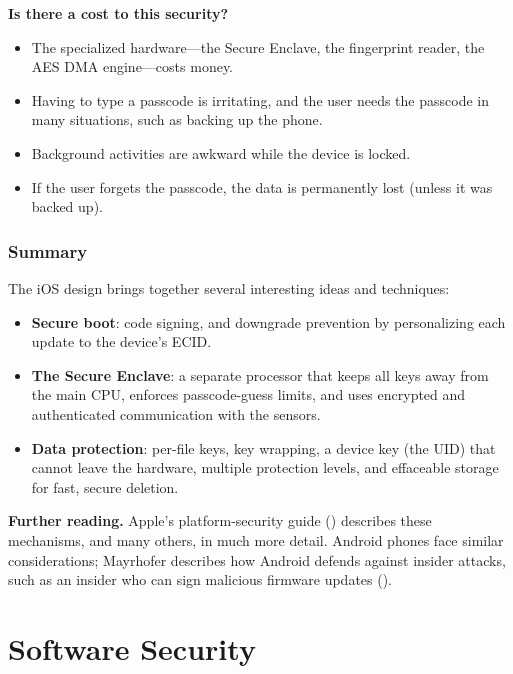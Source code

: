 \documentclass[
  letterpaper,
]{scrbook}
\providecommand{\tightlist}{%
  \setlength{\itemsep}{0pt}\setlength{\parskip}{0pt}}
\theoremstyle{definition}
\theoremstyle{plain}
\theoremstyle{plain}
\theoremstyle{remark}
\begin{document}
\textbf{Is there a cost to this security?}

\begin{itemize}
\tightlist
\item
  The specialized hardware---the Secure Enclave, the fingerprint reader,
  the AES DMA engine---costs money.
\item
  Having to type a passcode is irritating, and the user needs the
  passcode in many situations, such as backing up the phone.
\item
  Background activities are awkward while the device is locked.
\item
  If the user forgets the passcode, the data is permanently lost (unless
  it was backed up).
\end{itemize}

\section{Summary}\label{summary}

The iOS design brings together several interesting ideas and techniques:

\begin{itemize}
\tightlist
\item
  \textbf{Secure boot}: code signing, and downgrade prevention by
  personalizing each update to the device's ECID.
\item
  \textbf{The Secure Enclave}: a separate processor that keeps all keys
  away from the main CPU, enforces passcode-guess limits, and uses
  encrypted and authenticated communication with the sensors.
\item
  \textbf{Data protection}: per-file keys, key wrapping, a device key
  (the UID) that cannot leave the hardware, multiple protection levels,
  and effaceable storage for fast, secure deletion.
\end{itemize}

\textbf{Further reading.} Apple's platform-security guide
() describes
these mechanisms, and many others, in much more detail. Android phones
face similar considerations; Mayrhofer describes how Android defends
against insider attacks, such as an insider who can sign malicious
firmware updates ().

\part{Software Security}
\end{document}

